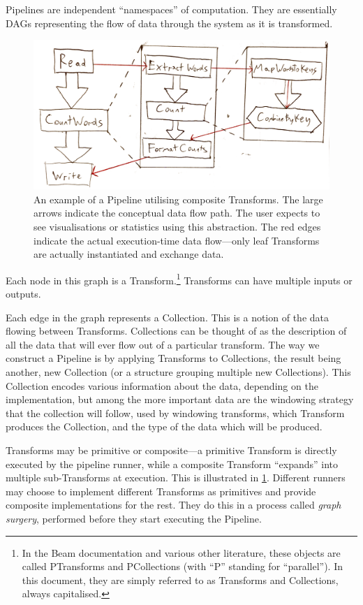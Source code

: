Pipelines are independent ``namespaces'' of computation.
They are essentially DAGs representing the flow of data through the system as it is transformed.

\begin{figure}[t]
	\includegraphics[width=\textwidth]{images/temp/composite-example}
	\caption{An example of a Pipeline utilising composite Transforms. The large arrows indicate the conceptual data flow path. The user expects to see visualisations or statistics using this abstraction. The red edges indicate the actual execution-time data flow---only leaf Transforms are actually instantiated and exchange data.}
	\label{fig:impl:composite-transforms}
\end{figure}

Each node in this graph is a Transform.\footnote
{
In the Beam documentation and various other literature, these objects are called PTransforms and PCollections (with ``P'' standing for ``parallel'').
In this document, they are simply referred to as Transforms and Collections, always capitalised.
}
Transforms can have multiple inputs or outputs.

Each edge in the graph represents a Collection.
This is a notion of the data flowing between Transforms.
Collections can be thought of as the description of all the data that will ever flow out of a particular transform.
The way we construct a Pipeline is by applying Transforms to Collections, the result being another, new Collection (or a structure grouping multiple new Collections).
This Collection encodes various information about the data, depending on the implementation, but among the more important data are the windowing strategy that the collection will follow, used by windowing transforms, which Transform produces the Collection, and the type of the data which will be produced.

Transforms may be primitive or composite---a primitive Transform is directly executed by the pipeline runner, while a composite Transform ``expands'' into multiple sub-Transforms at execution.
This is illustrated in \cref{fig:impl:composite-transforms}.
Different runners may choose to implement different Transforms as primitives and provide composite implementations for the rest.
They do this in a process called \emph{graph surgery}, performed before they start executing the Pipeline.

